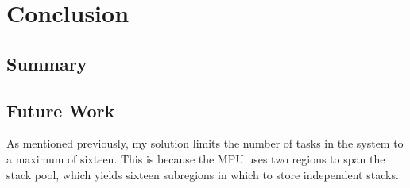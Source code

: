 
\chapter{Conclusion}

\section{Summary}

\section{Future Work}

As mentioned previously, my solution limits the number of tasks in the system to a maximum of sixteen. This is because the MPU uses two regions to span the stack pool, which yields sixteen subregions in which to store independent stacks. 